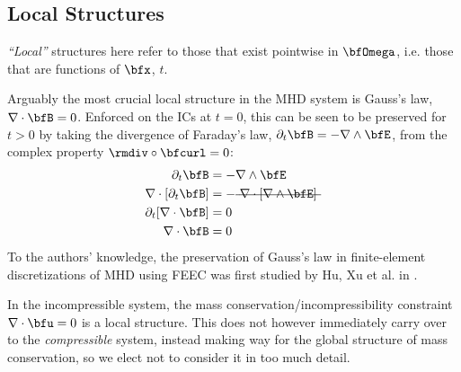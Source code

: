 \subsection*{Local Structures}
    \emph{``Local''} structures here refer to those that exist pointwise in $\bfOmega$, i.e. those that are functions of $\bfx$, $t$.
    
    Arguably the most crucial local structure in the MHD system is Gauss's law, $\nabla\cdot\bfB  =  0$. Enforced on the ICs at $t  =  0$, this can be seen to be preserved for $t  >  0$ by taking the divergence of Faraday's law, $\partial_{t}\bfB  =  - \nabla\wedge\bfE$, from the complex property $\rmdiv\circ\bfcurl  =  0$: \cite{Stratton_1941, Rosen_1980, Freistühler_Warnecke_2002}
    \begin{align}
                    \partial_{t}\bfB   &=  - \nabla\wedge\bfE  \\
        \nabla\cdot[\partial_{t}\bfB]  &=  - \mst{\nabla\cdot[\nabla\wedge\bfE]}  \\
        \partial_{t}[\nabla\cdot\bfB]  &=  0  \\
                     \nabla\cdot\bfB   &=  0
    \end{align}
    To the authors' knowledge, the preservation of Gauss's law in finite-element discretizations of MHD using FEEC was first studied by Hu, Xu et al. in \cite{Hu_Xu_2015, Hu_Ma_Xu_2017}.

    \begin{remark}
        In the incompressible system, the mass conservation/incompressibility constraint $\nabla\cdot\bfu  =  0$ is a local structure. This does not however immediately carry over to the \emph{compressible} system, instead making way for the global structure of mass conservation, so we elect not to consider it in too much detail.
    \end{remark}
